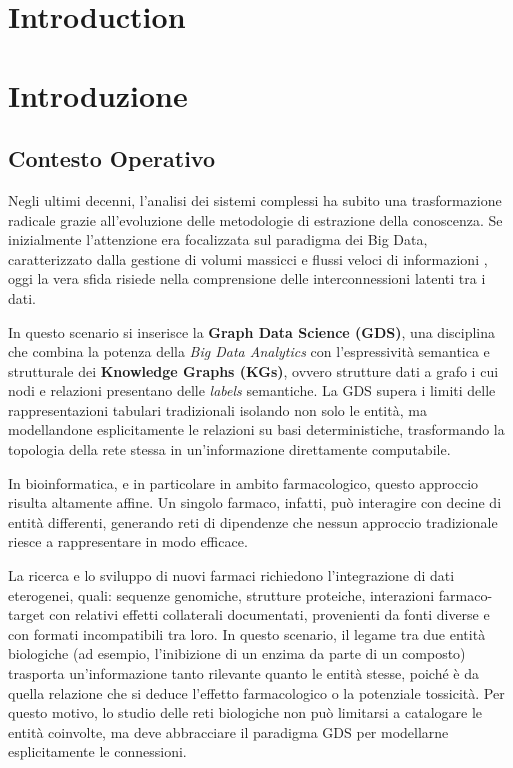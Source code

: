 {\chapter{Introduction}}
{\chapter{Introduzione}}
\label{sec:introduction}

\section{Contesto Operativo}
Negli ultimi decenni, l'analisi dei sistemi complessi ha subito una trasformazione radicale grazie all'evoluzione delle metodologie di estrazione della conoscenza. Se inizialmente l'attenzione era focalizzata sul paradigma dei Big Data, caratterizzato dalla gestione di volumi massicci e flussi veloci di informazioni \cite{atzeni2018basi}, oggi la vera sfida risiede nella comprensione delle interconnessioni latenti tra i dati. 

In questo scenario si inserisce la \textbf{Graph Data Science (GDS)}, una disciplina che combina la potenza della \textit{Big Data Analytics} con l'espressività semantica e strutturale dei \textbf{Knowledge Graphs (KGs)}, ovvero strutture dati a grafo i cui nodi e relazioni presentano delle \textit{labels} semantiche. La GDS supera i limiti delle rappresentazioni tabulari tradizionali isolando non solo le entità, ma modellandone esplicitamente le relazioni su basi deterministiche, trasformando la topologia della rete stessa in un'informazione direttamente computabile.

In bioinformatica, e in particolare in ambito farmacologico, questo approccio risulta altamente affine. Un singolo farmaco, infatti, può interagire con decine di entità differenti, generando reti di dipendenze che nessun approccio tradizionale riesce a rappresentare in modo efficace. 

La ricerca e lo sviluppo di nuovi farmaci richiedono l'integrazione di dati eterogenei, quali: sequenze genomiche, strutture proteiche, interazioni farmaco-target con relativi effetti collaterali documentati, provenienti da fonti diverse e con formati incompatibili tra loro. In questo scenario, il legame tra due entità biologiche (ad esempio, l'inibizione di un enzima da parte di un composto) trasporta un'informazione tanto rilevante quanto le entità stesse, poiché è da quella relazione che si deduce l'effetto farmacologico o la potenziale tossicità. Per questo motivo, lo studio delle reti biologiche non può limitarsi a catalogare le entità coinvolte, ma deve abbracciare il paradigma GDS per modellarne esplicitamente le connessioni.

